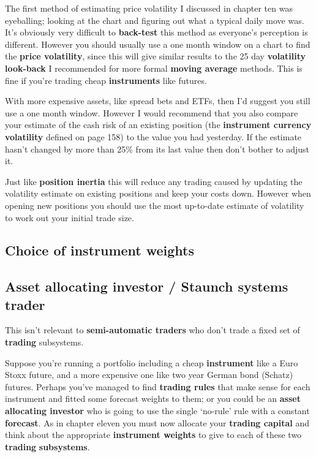 The first method of estimating price volatility I discussed in chapter ten was eyeballing; looking at the chart and figuring out what a typical daily move was. It's obviously very difficult to \textbf{back-test} this method as everyone's perception is different. However you should usually use a one month window on a chart to find the \textbf{price volatility}, since this will give similar results to the 25 day \textbf{volatility look-back} I recommended for more formal \textbf{moving average} methods. This is fine if you're trading cheap \textbf{instruments} like futures.

With more expensive assets, like spread bets and ETFs, then I'd suggest you still use a one month window. However I would recommend that you also compare your estimate of the cash risk of an existing position (the \textbf{instrument currency volatility} defined on page 158) to the value you had yesterday. If the estimate hasn't changed by more than 25\% from its last value then don't bother to adjust it.

Just like \textbf{position inertia} this will reduce any trading caused by updating the volatility estimate on existing positions and keep your costs down. However when opening new positions you should use the most up-to-date estimate of volatility to work out your initial trade size.

\subsection*{Choice of instrument weights}

\subsection*{Asset allocating investor / Staunch systems trader}

This isn't relevant to \textbf{semi-automatic traders} who don't trade a fixed set of \textbf{trading} subsystems.

Suppose you're running a portfolio including a cheap \textbf{instrument} like a Euro Stoxx future, and a more expensive one like two year German bond (Schatz) futures. Perhaps you've managed to find \textbf{trading rules} that make sense for each instrument and fitted some forecast weights to them; or you could be an \textbf{asset allocating investor} who is going to use the single ‘no-rule' rule with a constant \textbf{forecast}. As in chapter eleven you must now allocate your \textbf{trading capital} and think about the appropriate \textbf{instrument weights} to give to each of these two \textbf{trading} \textbf{subsystems}.

